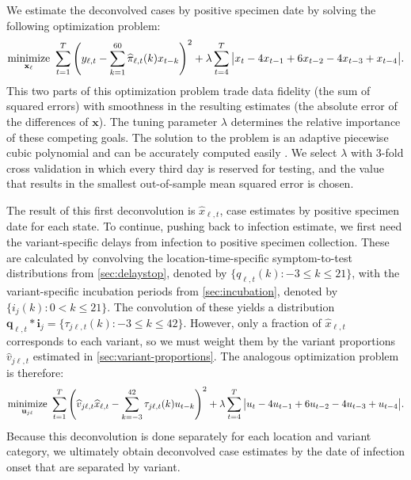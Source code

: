 \documentclass{article}
\begin{document}
We estimate the deconvolved cases by positive specimen date by solving the
following optimization problem:
\begin{align}
\operatorname*{minimize}_{\mathbf{x}_\ell}\ \sum_{t=1}^T 
\left( y_{\ell,t} -  \sum_{k=1}^{60}\widehat{\pi}_{\ell,t}(k) x_{t-k} \right)^2 
+ \lambda \sum_{t=4}^T \big|x_t - 4x_{t-1} + 6x_{t-2} -4x_{t-3}+ x_{t-4}\big|.
\end{align}
This two parts of this optimization problem trade data fidelity (the sum of
squared errors) with smoothness in the resulting estimates (the absolute error
of the differences of $\mathbf{x}$). The tuning parameter $\lambda$ determines
the relative importance of these competing goals. The solution to the problem is
an adaptive piecewise cubic polynomial \citep{tibshirani2014adaptive,
tibshirani2022divided} and can be accurately computed easily
\citep{ramdas2016fast}. We select $\lambda$ with $3$-fold cross validation
\citep{jahja2022real} in which every third day is reserved for testing, and the
value that results in the smallest out-of-sample mean squared error is chosen.

The result of this first deconvolution is $\widehat{x}_{\ell,t}$, case estimates
by positive specimen date for each state. To continue, pushing back to infection
estimate, we first need the variant-specific delays from infection to positive
specimen collection. These are calculated by convolving the
location-time-specific symptom-to-test distributions from
\autoref{sec:delaystop}, denoted by $\{q_{\ell,t}(k) : -3\leq k \leq 21\}$, with
the variant-specific incubation periods from \autoref{sec:incubation}, denoted
by $\{i_{j}(k) : 0 < k \leq 21\}$. The convolution of these yields a
distribution $\mathbf{q}_{\ell,t}*\mathbf{i}_j = \{\tau_{j\ell,t}(k): -3 \leq k
\leq 42\}$. However, only a fraction of $\widehat{x}_{\ell,t}$ corresponds to
each variant, so we must weight them by the variant proportions
$\widehat{v}_{j\ell,t}$ estimated in \autoref{sec:variant-proportions}. The
analogous optimization problem is therefore:
\begin{align}
\operatorname*{minimize}_{\mathbf{u}_{j\ell}}\ \sum_{t=1}^T 
\left( 
    \widehat{v}_{j\ell,t}\widehat{x}_{\ell,t} -  
    \sum_{k=-3}^{42} \tau_{j\ell,t}(k) u_{t-k} 
\right)^2 
+ \lambda \sum_{t=4}^T \big|u_{t} - 4u_{t-1} + 6u_{t-2} -4u_{t-3}+ u_{t-4}\big|.
\end{align}
Because this deconvolution is done separately for each location and variant
category, we ultimately obtain deconvolved case estimates by the date of
infection onset that are separated by variant.
\end{document}
